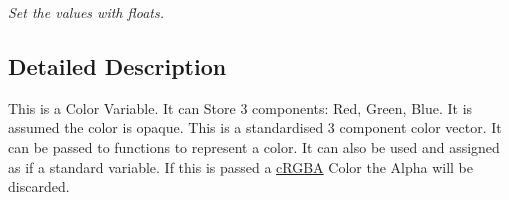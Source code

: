 \begin{DoxyCompactItemize}
\begin{DoxyCompactList}\small\item\em Set the values with floats. \end{DoxyCompactList}\end{DoxyCompactItemize}


\subsection{Detailed Description}
This is a Color Variable. It can Store 3 components: Red, Green, Blue. It is assumed the color is opaque. This is a standardised 3 component color vector. It can be passed to functions to represent a color. It can also be used and assigned as if a standard variable. If this is passed a \hyperlink{classc_r_g_b_a}{cRGBA} Color the Alpha will be discarded. 